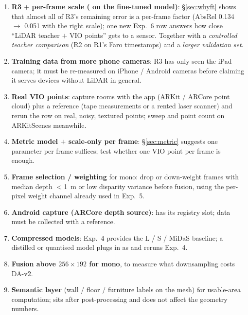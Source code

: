 \begin{enumerate}
\item \textbf{R3 $+$ per-frame scale ( on the fine-tuned model)}: \S\ref{sec:whyft} shows that
almost all of R3's remaining error is a per-frame factor (AbsRel 0.134 $\rightarrow$ 0.051 with the right scale); one
new Exp.~6 row answers how close ``LiDAR teacher $+$ VIO points'' gets to a sensor. Together with a \emph{controlled
teacher comparison} (R2 on R1's Faro timestamps) and a \emph{larger validation set}.
\item \textbf{Training data from more phone cameras}: R3 has only seen the iPad camera; it must be re-measured on
iPhone / Android cameras before claiming it serves devices without LiDAR in general.
\item \textbf{Real VIO points}: capture rooms with the app (ARKit  / ARCore point cloud) plus a
reference (tape measurements or a rented laser scanner) and rerun the  row on real, noisy, textured
points; sweep  and point count on ARKitScenes meanwhile.
\item \textbf{Metric model $+$ scale-only per frame}: \S\ref{sec:metric} suggests one parameter per frame suffices;
test whether one VIO point per frame is enough.
\item \textbf{Frame selection / weighting} for mono: drop or down-weight frames with median depth $<$\SI{1}{m} or low
disparity variance before fusion, using the per-pixel weight channel already used in Exp.~5.
\item \textbf{Android capture (ARCore depth source)}:  has its registry slot; data must be
collected with a reference.
\item \textbf{Compressed models}: Exp.~4 provides the L / S / MiDaS baseline; a distilled or quantised model plugs in as
 and reruns Exp.~4.
\item \textbf{Fusion above $256\times192$ for mono}, to measure what downsampling costs DA-v2.
\item \textbf{Semantic layer} (wall / floor / furniture labels on the mesh) for usable-area computation; sits after
post-processing and does not affect the geometry numbers.
\end{enumerate}
